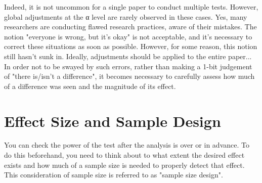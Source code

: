 \documentclass{ltjsbook}
\begin{document}
Indeed, it is not uncommon for a single paper to conduct multiple tests. However, global adjustments at the α level are rarely observed in these cases. Yes, many researchers are conducting flawed research practices, aware of their mistakes. The notion "everyone is wrong, but it's okay" is not acceptable, and it’s necessary to correct these situations as soon as possible. However, for some reason, this notion still hasn't sunk in. Ideally, adjustments should be applied to the entire paper...
In order not to be swayed by such errors, rather than making a 1-bit judgement of "there is/isn't a difference", it becomes necessary to carefully assess how much of a difference was seen and the magnitude of its effect.


\section{Effect Size and Sample Design}
You can check the power of the test after the analysis is over or in advance. To do this beforehand, you need to think about to what extent the desired effect exists and how much of a sample size is needed to properly detect that effect. This consideration of sample size is referred to as "sample size design".
\end{document}
